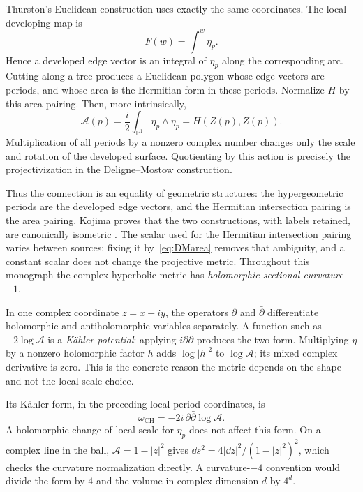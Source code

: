Thurston's Euclidean construction uses exactly the same coordinates.
The local developing map is
\[
 F(w)=\int^w\eta_p.
\]
Hence a developed edge vector is an integral of $\eta_p$ along the
corresponding arc. Cutting along a tree produces a Euclidean polygon
whose edge vectors are periods, and whose area is the Hermitian form
in these periods. Normalize $H$ by this area pairing. Then, more
intrinsically,
\begin{equation}
 \mathcal A(p)=\frac{i}{2}\int_{\mathbb P^1}\eta_p\wedge\overline{\eta_p}
             =H(Z(p),Z(p)).
 \label{eq:DMarea}
\end{equation}
Multiplication of all periods by a nonzero complex number changes only
the scale and rotation of the developed surface. Quotienting by this
action is precisely the projectivization in the Deligne--Mostow
construction.

Thus the connection is an equality of geometric structures: the
hypergeometric periods are the developed edge vectors, and the
Hermitian intersection pairing is the area pairing. Kojima proves that
the two constructions, with labels retained, are canonically isometric
\cite[Lemmas 4.1--4.2 and Theorem 4.3]{Kojima}. The scalar used for
the Hermitian intersection pairing varies between sources; fixing it
by~\eqref{eq:DMarea} removes that ambiguity, and a constant scalar
does not change the projective metric. Throughout this monograph the complex hyperbolic
metric has \emph{holomorphic sectional curvature $-1$}.

In one complex coordinate $z=x+iy$, the operators $\partial$ and
$\bar\partial$ differentiate holomorphic and antiholomorphic
variables separately. A function such as $-2\log\mathcal A$ is
a \emph{K\"ahler potential}: applying $i\partial\bar\partial$
produces the two-form. Multiplying $\eta$ by a nonzero holomorphic
factor $h$ adds $\log|h|^2$ to $\log\mathcal A$; its mixed
complex derivative is zero. This is the concrete reason the
metric depends on the shape and not the local scale choice.

Its K\"ahler form, in the preceding local period coordinates, is
\begin{equation}
 \omega_{\mathrm{CH}}=-2i\,\partial\bar\partial\log\mathcal A.
 \label{eq:CHpotential}
\end{equation}
A holomorphic change of local scale for $\eta_p$ does not affect this
form. On a complex line in the ball, $\mathcal A=1-|z|^2$ gives
$\dd s^2=4|\dd z|^2/(1-|z|^2)^2$, which checks the curvature
normalization directly. A curvature-$-4$ convention would divide the form by $4$ and
the volume in complex dimension $d$ by $4^d$.

